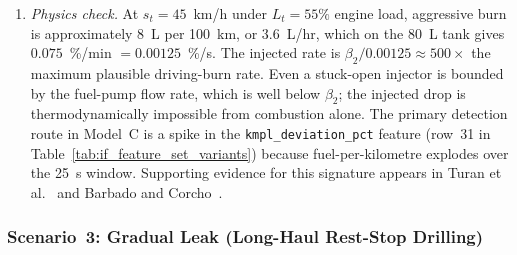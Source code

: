 \begin{enumerate}[label=\textbf{(\alph*)}, leftmargin=*]
    \item \textit{Physics check.} At $s_t = 45$~km/h under $L_t = 55\%$ engine load, aggressive burn is approximately 8~L per 100~km, or $3.6$~L/hr, which on the 80~L tank gives $0.075$~\%/min $= 0.00125$~\%/s. The injected rate is $\beta_2 / 0.00125 \approx 500\times$ the maximum plausible driving-burn rate. Even a stuck-open injector is bounded by the fuel-pump flow rate, which is well below $\beta_2$; the injected drop is thermodynamically impossible from combustion alone. The primary detection route in Model~C is a spike in the \texttt{kmpl\_deviation\_pct} feature (row~31 in Table~\ref{tab:if_feature_set_variants}) because fuel-per-kilometre explodes over the 25~s window. Supporting evidence for this signature appears in Turan et al.~\cite{turan2024detecting} and Barbado and Corcho~\cite{barbado2022interpretable}.
\end{enumerate}

\subsubsection{Scenario~3: Gradual Leak (Long-Haul Rest-Stop Drilling)}
\label{sec:inject_scenario3}

